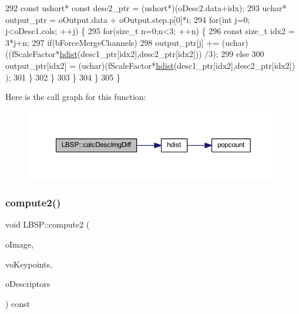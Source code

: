 \begin{DoxyCode}
292             \textcolor{keyword}{const} ushort* \textcolor{keyword}{const} desc2\_ptr = (ushort*)(oDesc2.data+idx);
293             uchar* output\_ptr = oOutput.data + oOutput.step.p[0]*i;
294             \textcolor{keywordflow}{for}(\textcolor{keywordtype}{int} j=0; j<oDesc1.cols; ++j) \{
295                 \textcolor{keywordflow}{for}(\textcolor{keywordtype}{size\_t} n=0;n<3; ++n) \{
296                     \textcolor{keyword}{const} \textcolor{keywordtype}{size\_t} idx2 = 3*j+n;
297                     \textcolor{keywordflow}{if}(bForceMergeChannels)
298                         output\_ptr[j] += (uchar)((fScaleFactor*\mbox{\hyperlink{_distance_utils_8h_ab13812ef6e21af771d6c0a856cd941b0}{hdist}}(desc1\_ptr[idx2],desc2\_ptr[idx2]))
      /3);
299                     \textcolor{keywordflow}{else}
300                         output\_ptr[idx2] = (uchar)(fScaleFactor*\mbox{\hyperlink{_distance_utils_8h_ab13812ef6e21af771d6c0a856cd941b0}{hdist}}(desc1\_ptr[idx2],desc2\_ptr[idx2])
      );
301                 \}
302             \}
303         \}
304     \}
305 \}
\end{DoxyCode}
Here is the call graph for this function\+:\nopagebreak
\begin{figure}[H]
\begin{center}
\leavevmode
\includegraphics[width=350pt]{class_l_b_s_p_a5d390a2a6f3d94a4edadae3718daf884_cgraph}
\end{center}
\end{figure}
\mbox{\label{class_l_b_s_p_ab61148341758dbc004660761bca04f84}} 
\subsubsection{\texorpdfstring{compute2()}{compute2()}\hspace{0.1cm}{\footnotesize\ttfamily [1/2]}}
{\footnotesize\ttfamily void L\+B\+S\+P\+::compute2 (\begin{DoxyParamCaption}\item[{const cv\+::\+Mat \&}]{o\+Image,  }\item[{std\+::vector$<$ cv\+::\+Key\+Point $>$ \&}]{vo\+Keypoints,  }\item[{cv\+::\+Mat \&}]{o\+Descriptors }\end{DoxyParamCaption}) const}



